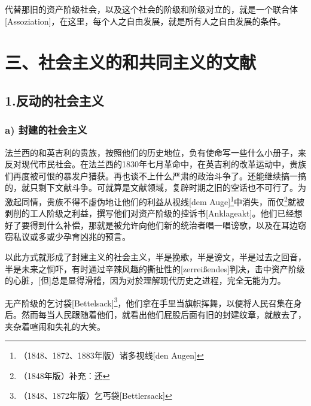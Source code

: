 \documentclass[a4paper,12pt]{ctexart}
\begin{document}
代替那旧的资产阶级社会，以及这个社会的阶级和阶级对立的，就是一个联合体[Assoziation]，在这里，每个人之自由发展，就是所有人之自由发展的条件。


\section{三、社会主义的和共同主义的文献}

\subsection{1.反动的社会主义}

\subsubsection{a) 封建的社会主义}

法兰西的和英吉利的贵族，按照他们的历史地位，负有使命写一些什么小册子，来反对现代市民社会。在法兰西的1830年七月革命中，在英吉利的改革运动中，贵族们再度被可恨的暴发户猎获。再也谈不上什么严肃的政治斗争了。还能继续搞一搞的，就只剩下文献斗争。可就算是文献领域，复辟时期之旧的空话也不可行了。为激起同情，贵族不得不虚伪地让他们的利益从视线[dem Auge]\footnote{（1848、1872、1883年版）诸多视线[den Augen]}中消失，而仅\footnote{（1848年版）补充：还}就被剥削的工人阶级之利益，撰写他们对资产阶级的控诉书[Anklageakt]。他们已经想好了要得到什么补偿，那就是被允许向他们新的统治者唱一唱谤歌，以及在耳边窃窃私议或多或少孕育凶兆的预言。

以此方式就形成了封建主义的社会主义，半是挽歌，半是谤文，半是过去之回音，半是未来之恫吓，有时通过辛辣风趣的撕扯性的[zerreißendes]判决，击中资产阶级的心脏，[但]总是显得滑稽，因为对於理解现代历史之进程，完全无能为力。

无产阶级的乞讨袋[Bettelsack]\footnote{（1848、1872年版）乞丐袋[Bettlersack]}，他们拿在手里当旗帜挥舞，以便将人民召集在身后。然而每当人民跟随着他们，就看出他们屁股后面有旧的封建纹章，就散去了，夹杂着喧闹和失礼的大笑。
\end{document}

